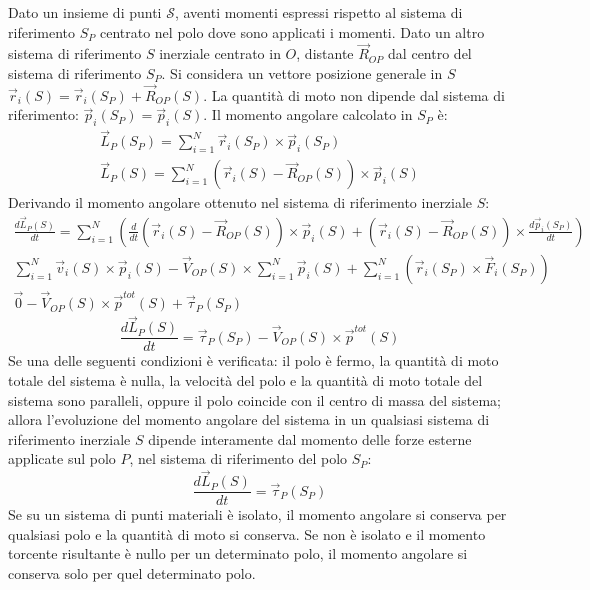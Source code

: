 \documentclass{article}
\numberwithin{equation}{subsection}
\begin{document}
Dato un insieme di punti $\mathscr{S}$, aventi momenti espressi 
rispetto al sistema di riferimento $S_P$ centrato 
nel polo dove sono applicati i momenti. Dato un altro sistema di riferimento $S$ 
inerziale centrato in $O$, distante $\vec{R}_{OP}$ dal centro 
del sistema di riferimento $S_P$. Si considera un vettore 
posizione generale in $S$ $\vec{r}_i(S)=\vec{r}_i(S_P)+\vec{R}_{OP}(S)$. La quantità di moto non dipende dal sistema di riferimento: $\vec{p}_i(S_P)=\vec{p}_i(S)$. 
Il momento angolare calcolato in $S_P$ è:
\begin{gather*}
    \vec{L}_P(S_P)=\displaystyle\sum_{i=1}^{N}\vec{r}_{i}(S_P)\times\vec{p}_i(S_P)\\
    \vec{L}_P(S)=\displaystyle\sum_{i=1}^{N}(\vec{r}_i(S)-\vec{R}_{OP}(S))\times\vec{p}_i(S)
\end{gather*}
Derivando il momento angolare ottenuto nel sistema di riferimento inerziale $S$: 
\begin{gather*}
    \displaystyle\frac{d\vec{L}_P(S)}{dt}=\sum_{i=1}^{N}\left(\frac{d}{dt}(\vec{r}_i(S)-\vec{R}_{OP}(S))\times\vec{p}_i(S)+(\vec{r}_i(S)-\vec{R}_{OP}(S))\times\frac{d\vec{p}_i(S_P)}{dt}\right)\\
    \displaystyle\sum_{i=1}^{N}\vec{v}_i(S)\times\vec{p}_i(S)-\vec{V}_{OP}(S)\times\sum_{i=1}^{N}\vec{p}_i(S)+\sum_{i=1}^{N}(\vec{r}_{i}(S_P)\times\vec{F}_i(S_P))\\
    \vec{0}-\vec{V}_{OP}(S)\times\vec{p}^{tot}(S)+\vec{\tau}_P(S_P)
\end{gather*}
\begin{equation}
    \displaystyle\frac{d\vec{L}_P(S)}{dt}=\vec{\tau}_P(S_P)-\vec{V}_{OP}(S)\times\vec{p}^{tot}(S)
\end{equation}
Se una delle seguenti condizioni è verificata: il polo è fermo, la quantità di moto totale del sistema è 
nulla, la velocità del polo e la quantità di moto 
totale del sistema sono paralleli, oppure il polo coincide con 
il centro di massa del sistema; allora l'evoluzione del momento angolare del sistema in un qualsiasi sistema di riferimento inerziale $S$ dipende interamente dal momento delle 
forze esterne applicate sul polo $P$, nel sistema di riferimento del polo $S_P$: 
\begin{equation}
    \displaystyle\frac{d\vec{L}_P(S)}{dt}=\vec{\tau}_P(S_P)
\end{equation}
Se su un sistema di punti materiali è isolato, il momento angolare si conserva per qualsiasi polo e la quantità di moto si conserva. Se non è isolato e il momento torcente risultante è nullo per un determinato polo, il momento 
angolare si conserva solo per quel determinato polo. 
\end{document}
